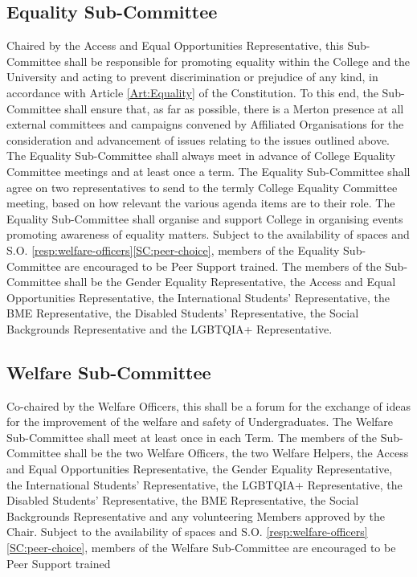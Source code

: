 \subsection{Equality Sub-Committee}
\npara Chaired by the Access and Equal Opportunities Representative, this Sub-Committee shall be responsible for promoting equality within the College and the University and acting to prevent discrimination or prejudice of any kind, in accordance with Article \ref{Art:Equality} of the Constitution. To this end, the Sub-Committee shall ensure that, as far as possible, there is a Merton presence at all external committees and campaigns convened by Affiliated Organisations for the consideration and advancement of issues relating to the issues outlined above.
\npara The Equality Sub-Committee shall always meet in advance of College Equality Committee meetings and at least once a term.
\npara The Equality Sub-Committee shall agree on two representatives to send to the termly College Equality Committee meeting, based on how relevant the various agenda items are to their role.
\npara The Equality Sub-Committee shall organise and support College in organising events promoting awareness of equality matters.
\npara Subject to the availability of spaces and S.O. \ref{resp:welfare-officers}\ref{SC:peer-choice}, members of the Equality Sub-Committee are encouraged to be Peer Support trained.
\npara The members of the Sub-Committee shall be the Gender Equality Representative, the Access and Equal Opportunities Representative, the International Students’ Representative, the BME Representative, the Disabled Students’ Representative, the Social Backgrounds Representative and the LGBTQIA+ Representative.
\subsection{Welfare Sub-Committee}
\npara Co-chaired by the Welfare Officers, this shall be a forum for the exchange of ideas for the improvement of the welfare and safety of Undergraduates.
\npara The Welfare Sub-Committee shall meet at least once in each Term.
\npara The members of the Sub-Committee shall be the two Welfare Officers, the two Welfare Helpers, the Access and Equal Opportunities Representative, the Gender Equality Representative, the International Students’ Representative, the LGBTQIA+ Representative, the Disabled Students’ Representative, the BME Representative, the Social Backgrounds Representative and any volunteering Members approved by the Chair.
\npara Subject to the availability of spaces and S.O. \ref{resp:welfare-officers}\ref{SC:peer-choice}, members of the Welfare Sub-Committee are encouraged to be Peer Support trained
